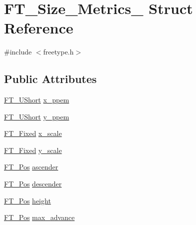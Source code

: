 \hypertarget{struct_f_t___size___metrics__}{}\section{F\+T\+\_\+\+Size\+\_\+\+Metrics\+\_\+ Struct Reference}
\label{struct_f_t___size___metrics__}


{\ttfamily \#include $<$freetype.\+h$>$}

\subsection*{Public Attributes}
\begin{DoxyCompactItemize}
\item 
\mbox{\hyperlink{fttypes_8h_a937f6c17cf5ffd09086d8610c37b9f58}{F\+T\+\_\+\+U\+Short}} \mbox{\hyperlink{struct_f_t___size___metrics___abb42b175a3450e9d8b84483f166d6c8a}{x\+\_\+ppem}}
\item 
\mbox{\hyperlink{fttypes_8h_a937f6c17cf5ffd09086d8610c37b9f58}{F\+T\+\_\+\+U\+Short}} \mbox{\hyperlink{struct_f_t___size___metrics___abcdb70cb9e39a74679bc39c07f3275f7}{y\+\_\+ppem}}
\item 
\mbox{\hyperlink{fttypes_8h_a5f5a679cc09f758efdd0d1c5feed3c3d}{F\+T\+\_\+\+Fixed}} \mbox{\hyperlink{struct_f_t___size___metrics___a5e92028bb9881e107a6fb75d557eaff1}{x\+\_\+scale}}
\item 
\mbox{\hyperlink{fttypes_8h_a5f5a679cc09f758efdd0d1c5feed3c3d}{F\+T\+\_\+\+Fixed}} \mbox{\hyperlink{struct_f_t___size___metrics___a1f8b1cb3538b9920127f721dd061379d}{y\+\_\+scale}}
\item 
\mbox{\hyperlink{ftimage_8h_af5f230f4b253d4c7715fd2e595614c90}{F\+T\+\_\+\+Pos}} \mbox{\hyperlink{struct_f_t___size___metrics___ab5fde60a2661d7b774f61c264a2a6070}{ascender}}
\item 
\mbox{\hyperlink{ftimage_8h_af5f230f4b253d4c7715fd2e595614c90}{F\+T\+\_\+\+Pos}} \mbox{\hyperlink{struct_f_t___size___metrics___a9b2ca3a4391803e8721ed99eb9953d52}{descender}}
\item 
\mbox{\hyperlink{ftimage_8h_af5f230f4b253d4c7715fd2e595614c90}{F\+T\+\_\+\+Pos}} \mbox{\hyperlink{struct_f_t___size___metrics___ae3361e264fb8a9e669f118bdb244439b}{height}}
\item 
\mbox{\hyperlink{ftimage_8h_af5f230f4b253d4c7715fd2e595614c90}{F\+T\+\_\+\+Pos}} \mbox{\hyperlink{struct_f_t___size___metrics___ac315a7a834ac1a57c7169ce021718958}{max\+\_\+advance}}
\end{DoxyCompactItemize}


